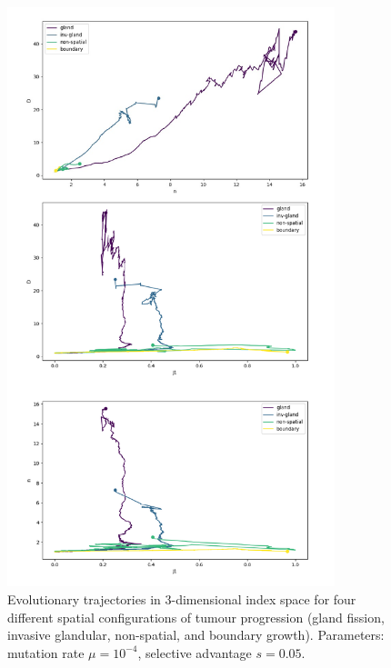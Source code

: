 \begin{figure}[h!]
    \centering
    \includegraphics[width=0.85\textwidth]{Chapter_3/figures/1e04005.pdf}
    \caption{Evolutionary trajectories in $3$-dimensional index space for four
    different spatial configurations of tumour progression (gland fission,
    invasive glandular, non-spatial, and boundary growth). Parameters: mutation
    rate $\mu = 10^{-4}$, selective advantage $s = 0.05$.}
    \label{fig:1e04_005}
\end{figure}
\clearpage

